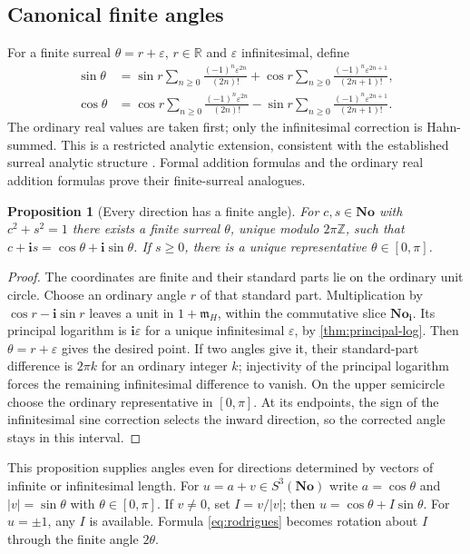 \documentclass[11pt,letterpaper]{article}
\numberwithin{equation}{section}
\newtheorem{proposition}[proposition]{Proposition}
\theoremstyle{definition}
\theoremstyle{remark}
\newcommand{\No}{\mathbf{No}}
\newcommand{\R}{\mathbb R}
\newcommand{\Z}{\mathbb Z}
\newcommand{\mm}{\mathfrak m}
\newcommand{\eps}{\varepsilon}
\newcommand{\ii}{\mathbf i}
\begin{document}
\subsection{Canonical finite angles}
For a finite surreal $\theta=r+\eps$, $r\in\R$ and $\eps$ infinitesimal, define
\begin{align}\label{eq:finite-trig}
 \sin\theta&=\sin r\sum_{n\ge0}\frac{(-1)^n\eps^{2n}}{(2n)!}
            +\cos r\sum_{n\ge0}\frac{(-1)^n\eps^{2n+1}}{(2n+1)!},\\
 \cos\theta&=\cos r\sum_{n\ge0}\frac{(-1)^n\eps^{2n}}{(2n)!}
            -\sin r\sum_{n\ge0}\frac{(-1)^n\eps^{2n+1}}{(2n+1)!}.
\end{align}
The ordinary real values are taken first; only the infinitesimal correction is Hahn-summed.
This is a restricted analytic extension, consistent with the established surreal analytic
structure \cite{vdDE,EK}. Formal addition formulas and the ordinary real addition formulas
prove their finite-surreal analogues.

\begin{proposition}[Every direction has a finite angle]\label{prop:finiteangles}
For $c,s\in\No$ with $c^2+s^2=1$ there exists a finite surreal $\theta$, unique modulo
$2\pi\Z$, such that $c+\ii s=\cos\theta+\ii\sin\theta$.
If $s\ge0$, there is a unique representative $\theta\in[0,\pi]$.
\end{proposition}
\begin{proof}
The coordinates are finite and their standard parts lie on the ordinary unit circle. Choose
an ordinary angle $r$ of that standard part. Multiplication by $\cos r-\ii\sin r$ leaves a
unit in $1+\mm_H$, within the commutative slice $\No_{\ii}$. Its principal logarithm is
$\ii\eps$ for a unique infinitesimal $\eps$, by \cref{thm:principal-log}. Then
$\theta=r+\eps$ gives the desired point. If two angles give it, their standard-part
difference is $2\pi k$ for an ordinary integer $k$; injectivity of the principal logarithm
forces the remaining infinitesimal difference to vanish. On the upper semicircle choose the
ordinary representative in $[0,\pi]$. At its endpoints, the sign of the infinitesimal sine
correction selects the inward direction, so the corrected angle stays in this interval.
\end{proof}

This proposition supplies angles even for directions determined by vectors of infinite or
infinitesimal length. For $u=a+v\in S^3(\No)$ write $a=\cos\theta$ and
$|v|=\sin\theta$ with $\theta\in[0,\pi]$. If $v\ne0$, set $I=v/|v|$; then
$u=\cos\theta+I\sin\theta$. For $u=\pm1$, any $I$ is available. Formula
\eqref{eq:rodrigues} becomes rotation about $I$ through the finite angle $2\theta$.
\end{document}

